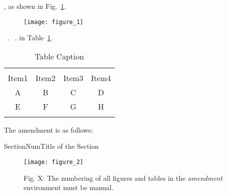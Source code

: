 
\reviewer{}

\begin{question}
\lipsum[1][1-5]
\end{question}

\response
\lipsum[1][6]

\begin{question}
\lipsum[2][1-5]
\end{question}

\response
\lipsum[2][6-10]
\lipsum[2][11], as shown in Fig.~\ref{fig_1}.
\begin{figure}[ht]
    \centering \texttt{[image: figure\_1]}
    \caption{\lipsum[2][12]}
    \label{fig_1}
\end{figure} 

\lipsum[3][1]~\cite{doe2021Title1}.
\lipsum[3][2]~\cite{doe2021Title2,bourne2021Title3}.
\lipsum[3][3] in Table~\ref{table_1}. 

\begin{table}[!h]
	\caption{Table Caption}
	\label{table_1}
	\centering
	\begin{tabular}{c c c c}
		\hline\hline \\ [-3mm]
		Item1    & Item2     & Item3   & Item4 \\ 
		\hline
		A & B & C & D \\
		E & F & G & H \\
		\hline\hline \\ [-3mm]
    \end{tabular}
\end{table}

\lipsum[3][4-8]
The amendment is as follows:
\begin{amendment}{SectionNum}{Title of the Section}
\lipsum[4][1-10]

\begin{figure}[H]
    \centering
    \texttt{[image: figure\_2]}
	\caption*{Fig. X: The numbering of all figures and tables in the \textit{amendment} environment must be manual.}
    \label{fig_ame_1}
\end{figure}
\end{amendment}





